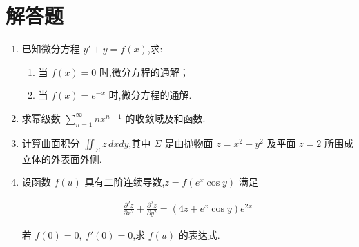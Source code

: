 \section{解答题}


\begin{enumerate}

\item 已知微分方程 $y'+y=f(x)$,求:

\begin{enumerate}
	\item[(1)] 当 $f(x)=0$ 时,微分方程的通解；
	\item[(2)] 当 $f(x)=e^{-x}$ 时,微分方程的通解.
\end{enumerate}

\item 求幂级数 $\sum_{n=1}^{\infty}n x^{n-1}$ 的收敛域及和函数.

\item 计算曲面积分 $\iint_{\Sigma} z\,dxdy$,其中 $\Sigma$ 是由抛物面 $z=x^2+y^2$ 及平面 $z=2$ 所围成立体的外表面外侧.

\item 设函数 $f(u)$ 具有二阶连续导数,$z=f(e^x\cos y)$ 满足

\begin{align*}
	\frac{\partial^2 z}{\partial x^2}+\frac{\partial^2 z}{\partial y^2}
	=(4z+e^x\cos y)e^{2x}
\end{align*}

若 $f(0)=0,\ f'(0)=0$,求 $f(u)$ 的表达式.


\end{enumerate}
\newpage
